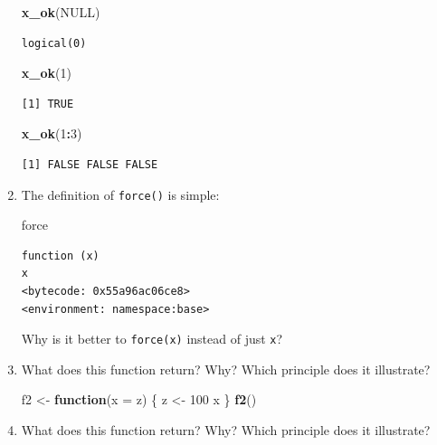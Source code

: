 \documentclass[]{book}
\newenvironment{Shaded}{\begin{snugshade}}{\end{snugshade}}
\newcommand{\ControlFlowTok}[1]{\textcolor[rgb]{0.13,0.29,0.53}{\textbf{#1}}}
\newcommand{\DataTypeTok}[1]{\textcolor[rgb]{0.13,0.29,0.53}{#1}}
\newcommand{\DecValTok}[1]{\textcolor[rgb]{0.00,0.00,0.81}{#1}}
\newcommand{\KeywordTok}[1]{\textcolor[rgb]{0.13,0.29,0.53}{\textbf{#1}}}
\newcommand{\NormalTok}[1]{#1}
\newcommand{\OperatorTok}[1]{\textcolor[rgb]{0.81,0.36,0.00}{\textbf{#1}}}
\newcommand{\OtherTok}[1]{\textcolor[rgb]{0.56,0.35,0.01}{#1}}
\newcommand{\StringTok}[1]{\textcolor[rgb]{0.31,0.60,0.02}{#1}}
\theoremstyle{definition}
\theoremstyle{definition}
\theoremstyle{definition}
\theoremstyle{remark}
\begin{document}
\begin{enumerate}
\begin{Shaded}
\begin{Highlighting}[]
\KeywordTok{x_ok}\NormalTok{(}\OtherTok{NULL}\NormalTok{)}
\end{Highlighting}
\end{Shaded}

\begin{verbatim}
logical(0)
\end{verbatim}

\begin{Shaded}
\begin{Highlighting}[]
\KeywordTok{x_ok}\NormalTok{(}\DecValTok{1}\NormalTok{)}
\end{Highlighting}
\end{Shaded}

\begin{verbatim}
[1] TRUE
\end{verbatim}

\begin{Shaded}
\begin{Highlighting}[]
\KeywordTok{x_ok}\NormalTok{(}\DecValTok{1}\OperatorTok{:}\DecValTok{3}\NormalTok{)}
\end{Highlighting}
\end{Shaded}

\begin{verbatim}
[1] FALSE FALSE FALSE
\end{verbatim}
\item
  The definition of \texttt{force()} is simple:

\begin{Shaded}
\begin{Highlighting}[]
\NormalTok{force}
\end{Highlighting}
\end{Shaded}

\begin{verbatim}
function (x) 
x
<bytecode: 0x55a96ac06ce8>
<environment: namespace:base>
\end{verbatim}

  Why is it better to \texttt{force(x)} instead of just \texttt{x}?
\item
  What does this function return? Why? Which principle does it
  illustrate?

\begin{Shaded}
\begin{Highlighting}[]
\NormalTok{f2 <-}\StringTok{ }\ControlFlowTok{function}\NormalTok{(}\DataTypeTok{x =}\NormalTok{ z) \{}
\NormalTok{  z <-}\StringTok{ }\DecValTok{100}
\NormalTok{  x}
\NormalTok{\}}
\KeywordTok{f2}\NormalTok{()}
\end{Highlighting}
\end{Shaded}
\item
  What does this function return? Why? Which principle does it
  illustrate?


\end{enumerate}
\end{document}
